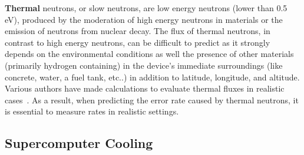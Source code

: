 \textbf{Thermal} neutrons, or slow neutrons, are low energy neutrons (lower than 0.5 eV), produced by the moderation of high energy neutrons in materials or the emission of neutrons from nuclear decay. 
%
The flux of thermal neutrons, in contrast to high energy neutrons, can be difficult to predict as it strongly depends on the environmental conditions as well the presence of other materials (primarily hydrogen containing) in the device's immediate surroundings (like concrete, water, a fuel tank, etc..) in addition to latitude, longitude, and altitude. Various authors have made calculations to evaluate thermal fluxes in realistic cases~\cite{ziegler2003, baumannsoft}. As a result, when predicting the error rate caused by thermal neutrons, it is essential to measure rates in realistic settings. 



\subsection{Supercomputer Cooling}
\label{sec_cooling}

